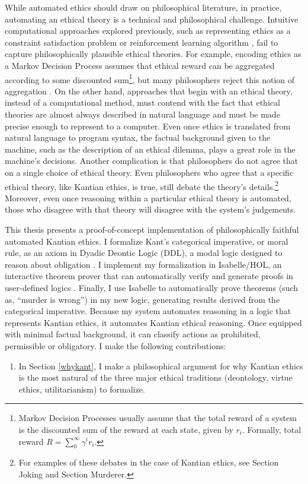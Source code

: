 \begin{isabellebody}
\begin{isamarkuptext}
While automated ethics should draw on philosophical literature, in practice, automating an ethical 
theory is a technical and philosophical challenge. Intuitive computational approaches explored 
previously, such as representing ethics as a constraint satisfaction problem \citep{csp} or reinforcement 
learning algorithm \citep{util1}, fail to capture philosophically plausible ethical theories. For 
example, encoding ethics as a Markov Decision Process assumes that ethical reward can be aggregated 
according to some discounted sum\footnote{Markov Decision Processes usually assume that the total
reward of a system is the discounted sum of the reward at each state, given by $r_i$. Formally, total
reward $R=\sum_0^{\infty}\gamma^ir_i$.}, but many philosophers reject this notion of aggregation \citep{consequentialismsep}. 
On the other hand, approaches that begin with an ethical theory, instead of a computational method, must contend with the 
fact that ethical theories are almost always described in natural language and must be made
precise enough to represent to a computer. Even once ethics is translated from natural 
language to program syntax, the factual background given to the machine, such as the description of 
an ethical dilemma, plays a great role in the machine's decisions. Another complication
is that philosophers do not agree that on a single choice of ethical theory. Even philosophers who
agree that a specific ethical theory, like Kantian ethics, is true, still debate the theory's 
details.\footnote{For examples of these debates in the case of Kantian ethics, see Section Joking
and Section Murderer.} Moreover, even once reasoning within a 
particular ethical theory is automated, those who disagree with that theory will disagree with the 
system's judgements.

This thesis presents a proof-of-concept implementation of philosophically faithful automated Kantian ethics. 
I formalize Kant's categorical imperative, or moral rule, as an axiom 
in Dyadic Deontic Logic (DDL), a modal logic designed to reason about 
obligation \citep{CJDDL}. I implement my formalization in Isabelle/HOL, an interactive theorem prover 
that can automatically verify and generate proofs in user-defined logics \citep{isabelle}. Finally, 
I use Isabelle to automatically prove theorems (such as, ``murder is wrong'') in my new logic, 
generating results derived from the categorical imperative. Because my system automates reasoning in 
a logic that represents Kantian ethics, it automates Kantian ethical reasoning. Once equipped with 
minimal factual background, it can classify actions as prohibited, permissible or obligatory. I 
make the following contributions:%
\end{isamarkuptext}\isamarkuptrue%
%
\begin{isamarkuptext}%
\begin{enumerate}
\item In Section \ref{whykant}, I make a philosophical argument for why Kantian ethics is the most natural of the three major
ethical traditions (deontology, virtue ethics, utilitarianism) to formalize.


\end{enumerate}
\end{isamarkuptext}
\end{isabellebody}
